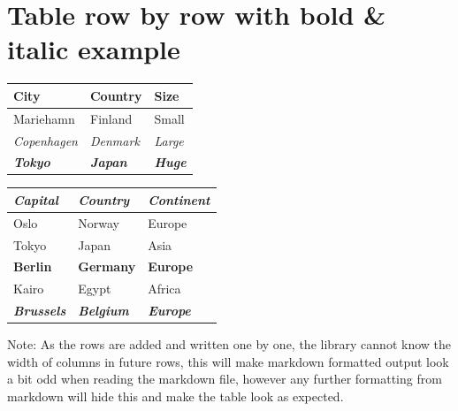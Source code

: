 \documentclass[a4paper]{report}
\begin{document}
\chapter{Table row by row with bold \& italic example}

\noindent
\begin{tabular}{lll}
\toprule
\textbf{City} & \textbf{Country} & \textbf{Size} \\
\midrule
Mariehamn & Finland & Small \\
\textit{Copenhagen} & \textit{Denmark} & \textit{Large} \\
\textit{\textbf{Tokyo}} & \textit{\textbf{Japan}} & \textit{\textbf{Huge}} \\
\bottomrule
\end{tabular}
\par\medskip

\noindent
\begin{tabular}{lll}
\toprule
\textit{Capital} & \textit{Country} & \textit{Continent} \\
\midrule
Oslo & Norway & Europe \\
Tokyo & Japan & Asia \\
\textbf{Berlin} & \textbf{Germany} & \textbf{Europe} \\
Kairo & Egypt & Africa \\
\textit{\textbf{Brussels}} & \textit{\textbf{Belgium}} & \textit{\textbf{Europe}} \\
\bottomrule
\end{tabular}
\par\medskip

Note: As the rows are added and written one by one, the library cannot know the width of columns in future rows, this will make markdown formatted output look a bit odd when reading the markdown file, however any further formatting from markdown will hide this and make the table look as expected.
\end{document}
